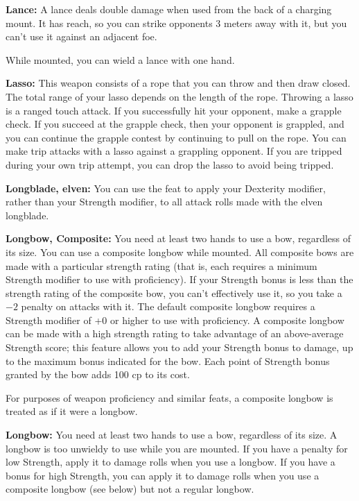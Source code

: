 \textbf{Lance:} A lance deals double damage when used from the back of a charging mount. It has reach, so you can strike opponents 3 meters away with it, but you can't use it against an adjacent foe.

While mounted, you can wield a lance with one hand. 

\textbf{Lasso:} This weapon consists of a rope that you can throw and then draw closed. The total range of your lasso depends on the length of the rope. Throwing a lasso is a ranged touch attack. If you successfully hit your opponent, make a grapple check. If you succeed at the grapple check, then your opponent is grappled, and you can continue the grapple contest by continuing to pull on the rope. You can make trip attacks with a lasso against a grappling opponent. If you are tripped during your own trip attempt, you can drop the lasso to avoid being tripped.

\textbf{Longblade, elven:} You can use the  feat to apply your Dexterity modifier, rather than your Strength modifier, to all attack rolls made with the elven longblade.

\textbf{Longbow, Composite:} You need at least two hands to use a bow, regardless of its size. You can use a composite longbow while mounted. All composite bows are made with a particular strength rating (that is, each requires a minimum Strength modifier to use with proficiency). If your Strength bonus is less than the strength rating of the composite bow, you can't effectively use it, so you take a $-2$ penalty on attacks with it. The default composite longbow requires a Strength modifier of +0 or higher to use with proficiency. A composite longbow can be made with a high strength rating to take advantage of an above-average Strength score; this feature allows you to add your Strength bonus to damage, up to the maximum bonus indicated for the bow. Each point of Strength bonus granted by the bow adds 100 cp to its cost.

For purposes of weapon proficiency and similar feats, a composite longbow is treated as if it were a longbow. 

\textbf{Longbow:} You need at least two hands to use a bow, regardless of its size. A longbow is too unwieldy to use while you are mounted. If you have a penalty for low Strength, apply it to damage rolls when you use a longbow. If you have a bonus for high Strength, you can apply it to damage rolls when you use a composite longbow (see below) but not a regular longbow. 

